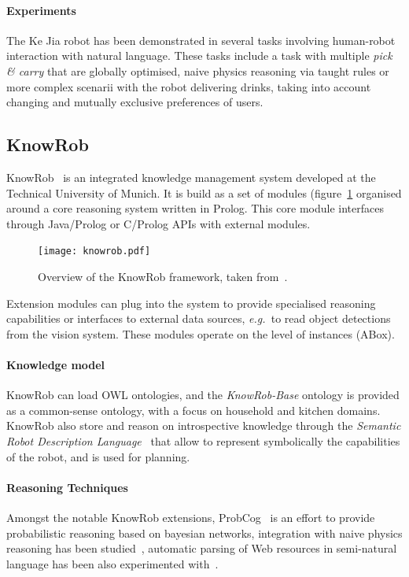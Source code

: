 \documentclass[a4paper, twocolumn]{article}
\newcommand{\eg}{{\textit{e.g.\ }}}
\begin{document}
\paragraph{Experiments} The Ke Jia robot has been demonstrated in several tasks
involving human-robot interaction with natural language. These tasks include a
task with multiple \emph{pick \& carry} that are globally optimised, naive
physics reasoning via taught rules or more complex scenarii with the robot
delivering drinks, taking into account changing and mutually exclusive
preferences of users.


\subsection{KnowRob}
\label{sect|knowrob}


{\sc KnowRob}~\cite{Tenorth2009a} is an integrated knowledge management system
developed at the Technical University of Munich. It is build as a set of
modules (figure~\ref{fig|knowrob} organised around a core reasoning system
written in Prolog. This core module interfaces through Java/Prolog or
C/Prolog APIs with external modules.

\begin{figure}
    \centering
    \texttt{[image: knowrob.pdf]}

    \caption{Overview of the {\sc KnowRob} framework, taken
    from~\cite{Tenorth2011}.}

    \label{fig|knowrob}
\end{figure}

Extension modules can plug into the system to provide specialised reasoning
capabilities or interfaces to external data sources, \eg to read object
detections from the vision system. These modules operate on the level of
instances (ABox).

\paragraph{Knowledge model} {\sc KnowRob} can load OWL ontologies, and the
\emph{KnowRob-Base} ontology is provided as a common-sense ontology, with a
focus on household and kitchen domains. {\sc KnowRob} also store and reason on
introspective knowledge through the \emph{Semantic Robot Description
Language}~\cite{Kunze2011} that allow to represent symbolically the
capabilities of the robot, and is used for planning.


\paragraph{Reasoning Techniques} Amongst the notable {\sc KnowRob} extensions,
{\sc ProbCog}~\cite{Jain2009} is an effort to provide probabilistic reasoning
based on bayesian networks, integration with naive physics reasoning has been
studied~\cite{Kunze2011a}, automatic parsing of Web resources in semi-natural
language has been also experimented with~\cite{Nyga2009}.
\end{document}
